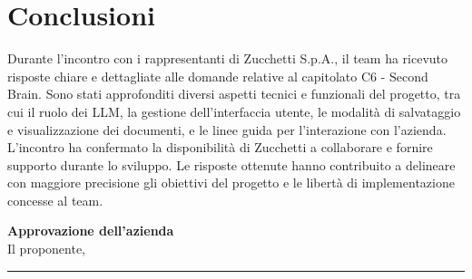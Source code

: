 \documentclass[a4paper,12pt]{article}
\begin{document}
\section{Conclusioni}{
  Durante l'incontro con i rappresentanti di Zucchetti S.p.A., il team ha ricevuto risposte chiare e dettagliate alle domande relative al capitolato C6 - Second Brain.
  Sono stati approfonditi diversi aspetti tecnici e funzionali del progetto, tra cui il ruolo dei LLM, la gestione dell'interfaccia utente, le modalità di salvataggio e visualizzazione dei documenti, e le linee guida per l'interazione con l'azienda.
  L'incontro ha confermato la disponibilità di Zucchetti a collaborare e fornire supporto durante lo sviluppo. Le risposte ottenute hanno contribuito a delineare con maggiore precisione gli obiettivi del progetto e le libertà di implementazione concesse al team.
}

\vspace{2cm}
\begin{flushright}
    \textbf{Approvazione dell'azienda} \\
    Il proponente,\\[0.5cm]
    \rule{6cm}{0.4pt}\\
\end{flushright}
\end{document}
